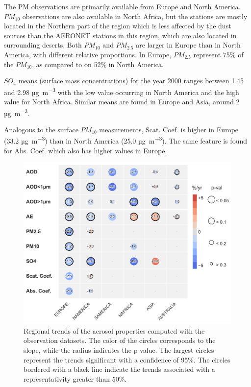 \documentclass[journal abbreviation, manuscript]{copernicus}
\begin{document}
The PM observations are primarily available from Europe and North America. $PM_{10}$ observations are also available in North Africa, but the stations are mostly located in the Northern part of the region which is less affected by the dust sources than the AERONET stations in this region, which are also located in surrounding deserts. Both $PM_{10}$ and $PM_{2.5}$ are larger in Europe than in North America, with different relative proportions. In Europe, $PM_{2.5}$ represent 75\% of the $PM_{10}$, as compared to on 52\% in North America.

$SO_{4}$ means (surface mass concentrations) for the year 2000 ranges between 1.45 and 2.98 \unit{µg.m^{-3}} with the low value occurring in North America and the high value for North Africa. Similar means are found in Europe and Asia, around 2 \unit{µg.m^{-3}}.

Analogous to the surface $PM_{10}$ measurements, Scat. Coef. is higher in Europe (33.2 \unit{µg.m^{-3}}) than in North America (25.0 \unit{µg.m^{-3}}). The same feature is found for Abs. Coef. which also has higher values in Europe.

\begin{figure}[t]
 \includegraphics[width=12cm]{../scripts/figs/heatmaps/OBS.png}
 \caption{Regional trends of the aerosol properties computed with the observation datasets. The color of the circles corresponds to the slope, while the radius indicates the p-value. The largest circles represent the trends significant with a confidence of 95\%. The circles bordered with a black line indicate the trends associated with a representativity greater than 50\%.}
 \label{fig:obs_trends}
\end{figure}
\end{document}
